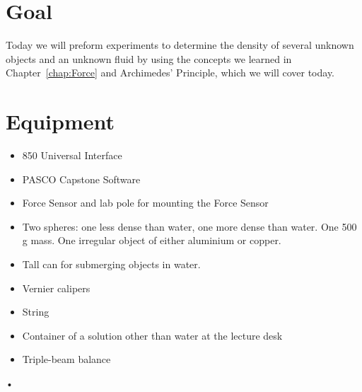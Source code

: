 \documentclass[main.tex]{subfiles}
\begin{document}
\section*{Goal}
Today we will preform experiments to determine the density of several unknown objects and an unknown fluid by using the concepts we learned in Chapter~\ref{chap:Force} and Archimedes' Principle, which we will cover today. 

\section*{Equipment}
\begin{itemize}
\item
850 Universal Interface
\item
PASCO Capstone Software
\item
Force Sensor and lab pole for mounting the Force Sensor
\item
Two spheres: one less dense than water, one more dense than water. One 500 g mass. One irregular object of either aluminium or copper.
\item
Tall can for submerging objects in water.
\item
Vernier calipers
\item
String
\item
Container of a solution other than water at the lecture desk
\item
Triple-beam balance
\end{itemize}•
\end{document}
